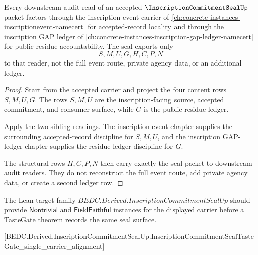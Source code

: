 \begin{theorem}
\label{thm:inscription-commitment-seal-sibling-factorization}
Every downstream audit read of an accepted $\InscriptionCommitmentSealUp$ packet factors through the inscription-event carrier of \autoref{ch:concrete-instances-inscriptionevent-namecert} for accepted-record locality and through the inscription GAP ledger of \autoref{ch:concrete-instances-inscription-gap-ledger-namecert} for public residue accountability. The seal exports only
$$
S,M,U,G,H,C,P,N
$$
to that reader, not the full event route, private agency data, or an additional ledger.
\end{theorem}
\begin{proof}
Start from the accepted carrier and project the four content rows $S,M,U,G$. The rows $S,M,U$ are the inscription-facing source, accepted commitment, and consumer surface, while $G$ is the public residue ledger.

Apply the two sibling readings. The inscription-event chapter supplies the surrounding accepted-record discipline for $S,M,U$, and the inscription GAP-ledger chapter supplies the residue-ledger discipline for $G$.

The structural rows $H,C,P,N$ then carry exactly the seal packet to downstream audit readers. They do not reconstruct the full event route, add private agency data, or create a second ledger row.
\end{proof}



The Lean target family $BEDC.Derived.InscriptionCommitmentSealUp$ should provide $\mathsf{Nontrivial}$ and $\mathsf{FieldFaithful}$ instances for the displayed carrier before a TasteGate theorem records the same seal surface.

[BEDC.Derived.InscriptionCommitmentSealUp.InscriptionCommitmentSealTasteGate\_single\_carrier\_alignment]

